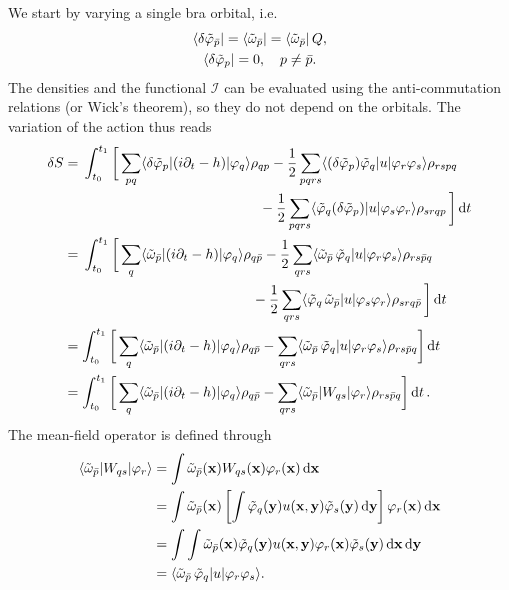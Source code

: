 \documentclass[aip,jcp,preprint,superscriptaddress,nofootinbib]{revtex4-1}
\begin{document}
We start by varying a single bra orbital, i.e.
\begin{subequations}
    \begin{gather}
        \bra{\delta\tilde{\varphi}_{\bar{p}}} = \bra{\tilde{\omega}_{\bar{p}}} = \bra{\tilde{\omega}_{\bar{p}}} Q, \\
        \bra{\delta\tilde{\varphi}_{p}} = 0, \quad p \neq \bar{p}.
    \end{gather}
\end{subequations}
The densities and the functional $\mathcal{I}$ can be evaluated using the anti-commutation relations (or Wick's theorem), so they do not
depend on the orbitals. The variation of the action thus reads
\begin{align}
    \delta S 
    &= 
    \begin{multlined}[t]
        \int_{t_0}^{t_1}
        \bigg[
            \sum_{pq} \elm{\phibravar{p}}{(i \partial_t - h)}{\phiket{q}} \rho_{qp} 
            - \frac{1}{2} \sum_{pqrs} \elm{(\phibravar{p}) \phibra{q}}{u}{\phiket{r} \phiket{s}} \rho_{rspq}  \\
            - \frac{1}{2} \sum_{pqrs} \elm{\phibra{q} (\phibravar{p})}{u}{\phiket{s} \phiket{r}} \rho_{srqp} \,
        \bigg] \dd{t} 
    \end{multlined} \nn
    &= 
    \begin{multlined}[t]
        \int_{t_0}^{t_1}
        \bigg[
            \sum_{q} \elm{\tilde{\omega}_{\bar{p}}}{(i \partial_t - h)}{\phiket{q}} \rho_{q\bar{p}} 
            - \frac{1}{2} \sum_{qrs} \elm{\tilde{\omega}_{\bar{p}} \, \phibra{q}}{u}{\phiket{r} \phiket{s}} \rho_{rs\bar{p}q} \\
            - \frac{1}{2} \sum_{qrs} \elm{\phibra{q} \, \tilde{\omega}_{\bar{p}}}{u}{\phiket{s} \phiket{r}} \rho_{srq\bar{p}} \,
        \bigg] \dd{t} 
    \end{multlined} \nn
    &=
    \int_{t_0}^{t_1}
    \bigg[
        \sum_{q} \elm{\tilde{\omega}_{\bar{p}}}{(i \partial_t - h)}{\phiket{q}} \rho_{q\bar{p}}
        - \sum_{qrs} \elm{\tilde{\omega}_{\bar{p}} \, \phibra{q}}{u}{\phiket{r} \phiket{s}} \rho_{rs\bar{p}q}
    \bigg] \dd{t} \nn
    &=
    \int_{t_0}^{t_1}
    \bigg[
        \sum_{q} \elm{\tilde{\omega}_{\bar{p}}}{(i \partial_t - h)}{\phiket{q}} \rho_{q\bar{p}}
        - \sum_{qrs} \elm{\tilde{\omega}_{\bar{p}}}{ W_{qs} }{\phiket{r}} \rho_{rs\bar{p}q}
    \bigg] \dd{t}.
\end{align}
The mean-field operator is defined through
\begin{align}
    \langle \tilde{\omega}_{\bar{p}} \vert  W_{qs}  \vert \varphi_{r} \rangle
    &= \int \tilde{\omega}_{\bar{p}} (\mathbf{x}) W_{qs} (\mathbf{x}) \varphi_{r} (\mathbf{x}) \dd{\mathbf{x}} \nonumber\\
    &= \int \tilde{\omega}_{\bar{p}} (\mathbf{x}) 
    \left[\int \tilde{\varphi}_{q} (\mathbf{y}) u(\mathbf{x}, \mathbf{y}) \tilde{\varphi}_{s} (\mathbf{y}) \dd{\mathbf{y}}\right]
    \varphi_{r} (\mathbf{x}) \dd{\mathbf{x}} \nonumber\\ 
    &= \int \int 
    \tilde{\omega}_{\bar{p}} (\mathbf{x}) 
    \tilde{\varphi}_{q} (\mathbf{y}) 
    u(\mathbf{x}, \mathbf{y}) 
    \varphi_{r} (\mathbf{x}) 
    \tilde{\varphi}_{s} (\mathbf{y})
    \dd{\mathbf{x}} \dd{\mathbf{y}} \nonumber\\
    &= \langle \tilde{\omega}_{\bar{p}} \, \tilde{\varphi}_{q} \vert u \vert \varphi_{r} \varphi_{s} \rangle.
\end{align}
\end{document}

